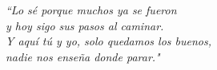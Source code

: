 \cleardoublepage

\thispagestyle{empty}
\null\vfill

\begin{flushright}
\parbox{8cm}{
  \raggedright{\large\itshape
   ``Lo s\'{e} porque muchos ya se fueron \\ 
  y hoy sigo sus pasos al caminar. \\
  Y aqu\'{i} t\'{u} y yo, solo quedamos los buenos, \\ 
  nadie nos ense\~{n}a donde parar."\par\bigskip
  }   
  \par
}
\end{flushright}

\vfill\vfill

\clearpage







